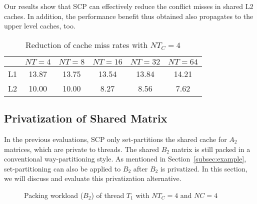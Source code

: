 Our results show that SCP can effectively
reduce the conflict misses in shared L2 caches.
In addition, the performance benefit thus obtained
also propagates to the upper level caches, too.

\begin{table}
  \centering
  \caption{Reduction of cache miss rates with $NT_C=4$}
  \label{tab:papi}
  \setlength{\tabcolsep}{3.5pt}
  \begin{tabular}{lccccc}
    \toprule
     & $NT=4$ & $NT=8$ & $NT=16$ & $NT=32$ & $NT=64$ \\
    \midrule
    L1     & 13.87 & 13.75 & 13.54 & 13.84 & 14.21 \\
    L2     & 10.00 & 10.00 & 8.27 & 8.56 & 7.62 \\
    \bottomrule
  \end{tabular}
\end{table}

\subsection{Privatization of Shared Matrix}\label{subsec:privb}
In the previous evaluations, SCP only set-partitions the shared cache
for $A_2$ matrices, which are private to threads.
The shared $B_2$ matrix is still packed
in a conventional way-partitioning style.
As mentioned in Section~\ref{subsec:example},
set-partitioning can also be applied to $B_2$ after $B_2$ is privatized.
In this section, we will discuss and evaluate this privatization alternative.

\begin{figure}
  \centering
  \caption{Packing workload ($B_2$) of thread $T_1$ with $NT_C=4$ and $NC=4$}
  \label{fig:packb}
\end{figure}

